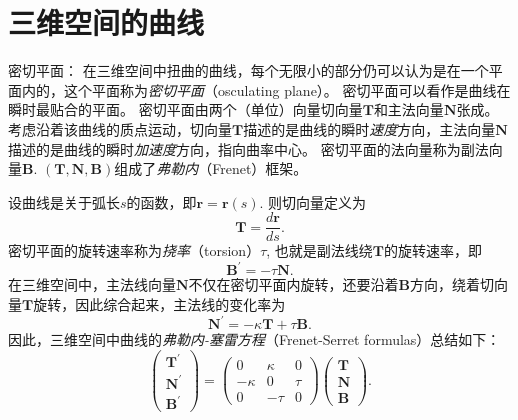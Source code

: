 \documentclass{article}
\begin{document}
\section{三维空间的曲线}

密切平面：
在三维空间中扭曲的曲线，每个无限小的部分仍可以认为是在一个平面内的，这个平面称为\emph{密切平面}（osculating plane）。
密切平面可以看作是曲线在瞬时最贴合的平面。
密切平面由两个（单位）向量切向量$\mathbf{T}$和主法向量$\mathbf{N}$张成。
考虑沿着该曲线的质点运动，切向量$\mathbf{T}$描述的是曲线的瞬时\emph{速度}方向，主法向量$\mathbf{N}$描述的是曲线的瞬时\emph{加速度}方向，指向曲率中心。
密切平面的法向量称为副法向量$\mathbf{B}$.
$(\mathbf{T}, \mathbf{N}, \mathbf{B})$组成了\emph{弗勒内}（Frenet）框架。

设曲线是关于弧长$s$的函数，即$\mathbf{r}=\mathbf{r}(s)$.
则切向量定义为
\begin{equation*}
    \mathbf{T}=\frac{d\mathbf{r}}{ds}.
\end{equation*}
密切平面的旋转速率称为\emph{挠率}（torsion）$\tau$, 也就是副法线绕$\mathbf{T}$的旋转速率，即
\begin{equation}
    \mathbf{B}^{\prime}=-\tau\mathbf{N}.
\end{equation}
在三维空间中，主法线向量$\mathbf{N}$不仅在密切平面内旋转，还要沿着$\mathbf{B}$方向，绕着切向量$\mathbf{T}$旋转，因此综合起来，主法线的变化率为
\begin{equation}
    \mathbf{N}^{\prime}=-\kappa\mathbf{T}+\tau\mathbf{B}.
\end{equation}
因此，三维空间中曲线的\emph{弗勒内-塞雷方程}（Frenet-Serret formulas）总结如下：
\begin{equation}
    \begin{pmatrix}
        \mathbf{T}^{\prime} \\
        \mathbf{N}^{\prime} \\
        \mathbf{B}^{\prime}
    \end{pmatrix}
    =
    \begin{pmatrix}
        0 & \kappa & 0 \\
        -\kappa & 0 & \tau \\
        0 & -\tau & 0
    \end{pmatrix}
    \begin{pmatrix}
        \mathbf{T} \\
        \mathbf{N} \\
        \mathbf{B}
    \end{pmatrix}.
\end{equation}
\end{document}
